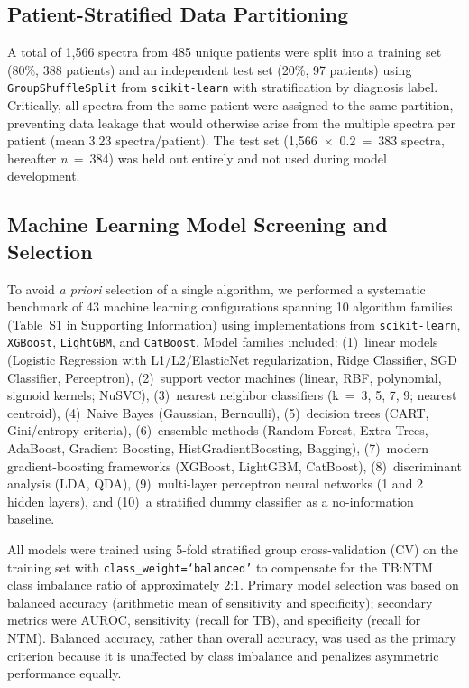 \documentclass[journal=ancham, manuscript=article, layout=traditional]{achemso}
\begin{document}
\subsection{Patient-Stratified Data Partitioning}

A total of 1,566 spectra from 485 unique patients were split into a
training set (80\%, 388 patients) and an independent test set (20\%,
97 patients) using \texttt{GroupShuffleSplit} from
\texttt{scikit-learn}\cite{scikit-learn} with stratification by
diagnosis label.
Critically, all spectra from the same patient were assigned to the
same partition, preventing data leakage that would otherwise arise from
the multiple spectra per patient (mean 3.23 spectra/patient).
The test set (1,566~$\times$~0.2~=~383 spectra, hereafter
\textit{n}~=~384) was held out entirely and not used during model
development.

\subsection{Machine Learning Model Screening and Selection}

To avoid \textit{a priori} selection of a single algorithm, we
performed a systematic benchmark of 43 machine learning
configurations spanning 10 algorithm families
(Table~S1 in Supporting Information) using implementations from
\texttt{scikit-learn}, \texttt{XGBoost}\cite{Chen2016XGBoost},
\texttt{LightGBM}\cite{Ke2017LightGBM}, and
\texttt{CatBoost}\cite{Prokhorenkova2018CatBoost}.
Model families included: (1)~linear models
(Logistic Regression with L1/L2/ElasticNet regularization,
Ridge Classifier, SGD Classifier, Perceptron),
(2)~support vector machines (linear, RBF, polynomial, sigmoid kernels;
NuSVC), (3)~nearest neighbor classifiers (k~=~3, 5, 7, 9; nearest
centroid), (4)~Naive Bayes (Gaussian, Bernoulli),
(5)~decision trees (CART, Gini/entropy criteria),
(6)~ensemble methods (Random Forest, Extra Trees, AdaBoost,
Gradient Boosting, HistGradientBoosting, Bagging),
(7)~modern gradient-boosting frameworks (XGBoost, LightGBM, CatBoost),
(8)~discriminant analysis (LDA, QDA),
(9)~multi-layer perceptron neural networks (1 and 2 hidden layers),
and (10)~a stratified dummy classifier as a no-information baseline.

All models were trained using 5-fold stratified group cross-validation
(CV) on the training set with \texttt{class\_weight=`balanced'} to
compensate for the TB:NTM class imbalance ratio of approximately
2:1.
Primary model selection was based on balanced accuracy (arithmetic
mean of sensitivity and specificity); secondary metrics were AUROC,
sensitivity (recall for TB), and specificity (recall for NTM).
Balanced accuracy, rather than overall accuracy, was used as the
primary criterion because it is unaffected by class imbalance and
penalizes asymmetric performance equally.\cite{Brodersen2010}
\end{document}
